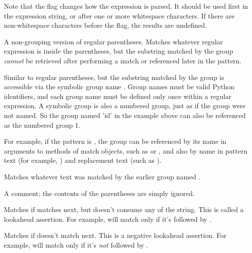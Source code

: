 \begin{list}{}{\leftmargin 0.7in }
Note that the  flag changes how the expression is parsed.
It should be used first in the expression string, or after one or more
whitespace characters.  If there are non-whitespace characters before
the flag, the results are undefined.

\item[\code{(?:...)}] A non-grouping version of regular parentheses.
Matches whatever regular expression is inside the parentheses, but the
substring matched by the
group \emph{cannot} be retrieved after performing a match or
referenced later in the pattern.

\item[\code{(?P<\var{name}>...)}] Similar to regular parentheses, but
the substring matched by the group is accessible via the symbolic group
name .  Group names must be valid Python identifiers, and
each group name must be defined only once within a regular expression.  A
symbolic group is also a numbered group, just as if the group were not
named.  So the group named 'id' in the example above can also be
referenced as the numbered group 1.

For example, if the pattern is
, the group can be referenced by its
name in arguments to methods of match objects, such as
 or , and also by name in
pattern text (for example, ) and replacement text
(such as ).

\item[\code{(?P=\var{name})}] Matches whatever text was matched by the
earlier group named .

\item[\code{(?\#...)}] A comment; the contents of the parentheses are
simply ignored.

\item[\code{(?=...)}] Matches if  matches next, but doesn't
consume any of the string.  This is called a lookahead assertion.  For
example,  will match  only if it's
followed by .

\item[\code{(?!...)}] Matches if  doesn't match next.  This
is a negative lookahead assertion.  For example,
 will match  only if it's \emph{not}
followed by .


\end{list}
